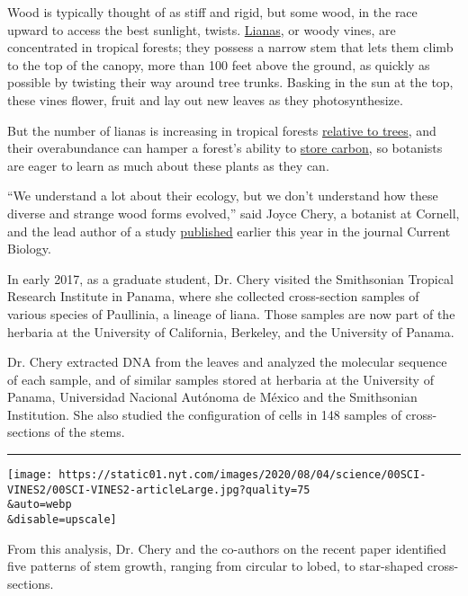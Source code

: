 Wood is typically thought of as stiff and rigid, but some wood, in the
race upward to access the best sunlight, twists.
\href{http://www.lianaecologyproject.com/}{Lianas}, or woody vines, are
concentrated in tropical forests; they possess a narrow stem that lets
them climb to the top of the canopy, more than 100 feet above the
ground, as quickly as possible by twisting their way around tree trunks.
Basking in the sun at the top, these vines flower, fruit and lay out new
leaves as they photosynthesize.

But the number of lianas is increasing in tropical forests
\href{https://www.nytimes.com/2011/05/24/science/24vine.html}{relative
to trees}, and their overabundance can hamper a forest's ability to
\href{https://www.nytimes.com/2015/10/13/science/study-quantifies-liana-vines-threat-to-forests.html}{store
carbon}, so botanists are eager to learn as much about these plants as
they can.

``We understand a lot about their ecology, but we don't understand how
these diverse and strange wood forms evolved,'' said Joyce Chery, a
botanist at Cornell, and the lead author of a study
\href{https://www.cell.com/current-biology/fulltext/S0960-9822(19)31442-3?_returnURL=https\%3A\%2F\%2Flinkinghub.elsevier.com\%2Fretrieve\%2Fpii\%2FS0960982219314423\%3Fshowall\%3Dtrue}{published}
earlier this year in the journal Current Biology.

In early 2017, as a graduate student, Dr. Chery visited the Smithsonian
Tropical Research Institute in Panama, where she collected cross-section
samples of various species of Paullinia, a lineage of liana. Those
samples are now part of the herbaria at the University of California,
Berkeley, and the University of Panama.

Dr. Chery extracted DNA from the leaves and analyzed the molecular
sequence of each sample, and of similar samples stored at herbaria at
the University of Panama, Universidad Nacional Autónoma de México and
the Smithsonian Institution. She also studied the configuration of cells
in 148 samples of cross-sections of the stems.

\begin{center}\rule{0.5\linewidth}{\linethickness}\end{center}

\texttt{[image: https://static01.nyt.com/images/2020/08/04/science/00SCI-VINES2/00SCI-VINES2-articleLarge.jpg?quality=75\\\&auto=webp\\\&disable=upscale]}

From this analysis, Dr. Chery and the co-authors on the recent paper
identified five patterns of stem growth, ranging from circular to lobed,
to star-shaped cross-sections.

